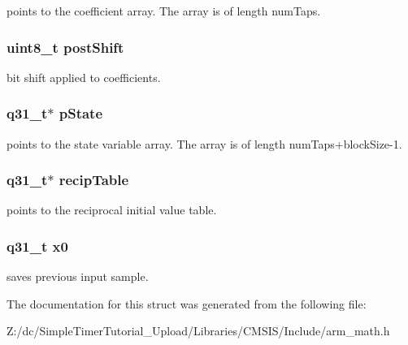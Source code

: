 points to the coefficient array. The array is of length num\-Taps. \hypertarget{structarm__lms__norm__instance__q31_a74050e9f36542bd56f4052381a82ae8f}{
\subsubsection[{post\-Shift}]{\setlength{\rightskip}{0pt plus 5cm}uint8\-\_\-t post\-Shift}}\label{structarm__lms__norm__instance__q31_a74050e9f36542bd56f4052381a82ae8f}
bit shift applied to coefficients. \hypertarget{structarm__lms__norm__instance__q31_adee4ba3ee8869865af7d8fa08ca913d6}{
\subsubsection[{p\-State}]{\setlength{\rightskip}{0pt plus 5cm}q31\-\_\-t$\ast$ p\-State}}\label{structarm__lms__norm__instance__q31_adee4ba3ee8869865af7d8fa08ca913d6}
points to the state variable array. The array is of length num\-Taps+block\-Size-\/1. \hypertarget{structarm__lms__norm__instance__q31_aec8a88dd688519b6b1e3c8d2e24bb775}{
\subsubsection[{recip\-Table}]{\setlength{\rightskip}{0pt plus 5cm}q31\-\_\-t$\ast$ recip\-Table}}\label{structarm__lms__norm__instance__q31_aec8a88dd688519b6b1e3c8d2e24bb775}
points to the reciprocal initial value table. \hypertarget{structarm__lms__norm__instance__q31_a973b8350a0c7b113a5f002bc0b86bf76}{
\subsubsection[{x0}]{\setlength{\rightskip}{0pt plus 5cm}q31\-\_\-t x0}}\label{structarm__lms__norm__instance__q31_a973b8350a0c7b113a5f002bc0b86bf76}
saves previous input sample. 

The documentation for this struct was generated from the following file\-:\begin{DoxyCompactItemize}
\item 
Z\-:/dc/\-Simple\-Timer\-Tutorial\-\_\-\-Upload/\-Libraries/\-C\-M\-S\-I\-S/\-Include/arm\-\_\-math.\-h\end{DoxyCompactItemize}
